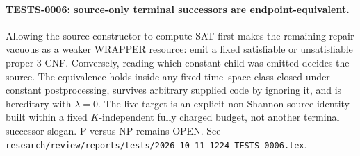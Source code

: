 \paragraph{TESTS-0006: source-only terminal successors are endpoint-equivalent.}
Allowing the source constructor to compute SAT first makes the remaining
repair vacuous as a weaker WRAPPER resource: emit a fixed satisfiable or
unsatisfiable proper 3-CNF.  Conversely, reading which constant child was
emitted decides the source.  The equivalence holds inside any fixed
time--space class closed under constant postprocessing, survives arbitrary
supplied code by ignoring it, and is hereditary with $\lambda=0$.  The live
target is an explicit non-Shannon source identity built within a fixed
$K$-independent fully charged budget, not another terminal successor slogan.
P versus NP remains OPEN.  See
\texttt{research/review/reports/tests/2026-10-11\_1224\_TESTS-0006.tex}.

